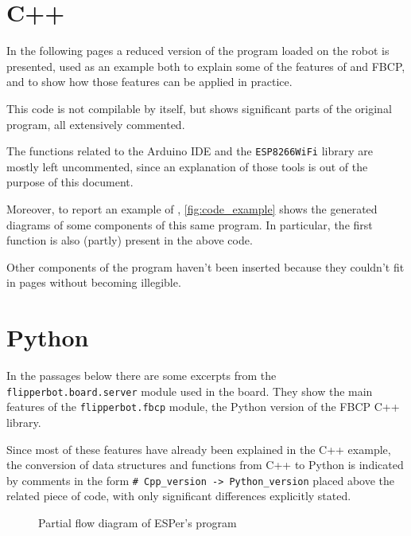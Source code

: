 \section{C++}
In the following pages a reduced version of the program loaded on the robot is presented,
used as an example both to explain some of the features of \ScheMo{} and FBCP,
and to show how those features can be applied in practice.

This code is not compilable by itself, but shows significant parts of the
original program, all extensively commented.

The functions related to the Arduino IDE and the \Verb|ESP8266WiFi| library are
mostly left uncommented, since an explanation of those tools is out of the
purpose of this document.



Moreover, to report an example of \ScheMoTeX{}, \autoref{fig:code_example} shows the
generated diagrams of some components of this same program. In particular,
the first function is also (partly) present in the above code.

Other components of the program haven't been inserted because they couldn't fit
in pages without becoming illegible.

\section{Python}
In the passages below there are some excerpts from the \Verb|flipperbot.board.server| module
used in the board. They show the main features of the \Verb|flipperbot.fbcp|
module, the Python version of the FBCP C++ library.

Since most of these features have already been explained in the C++ example,
the conversion of data structures and functions from C++ to Python is indicated
by comments in the form \Verb|# Cpp_version -> Python_version| placed above the
related piece of code, with only significant differences explicitly stated.



\begin{figure}[p]
  
  \caption{Partial flow diagram of ESPer's program}
  \label{fig:code_example}
\end{figure}
